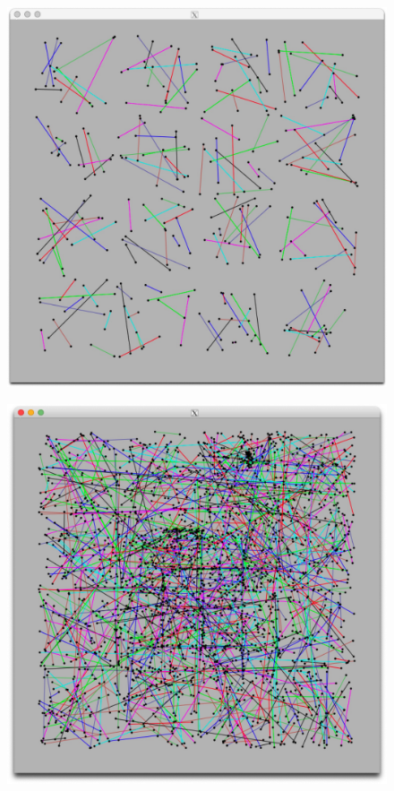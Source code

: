 \documentclass[letterpaper,11pt]{exam}
\begin{document}
\begin{figure}[h]
    \begin{minipage}{0.3\textwidth}
        \centering
        \includegraphics[width=\textwidth]{img/easy_4096.jpg}
        \label{fig:question1a}
    \end{minipage}
    \hspace{0.2cm}
    \begin{minipage}{0.3\textwidth}
        \centering
        \includegraphics[width=\textwidth]{img/hard_4096.jpg}

\end{minipage}
\end{figure}
\end{document}

